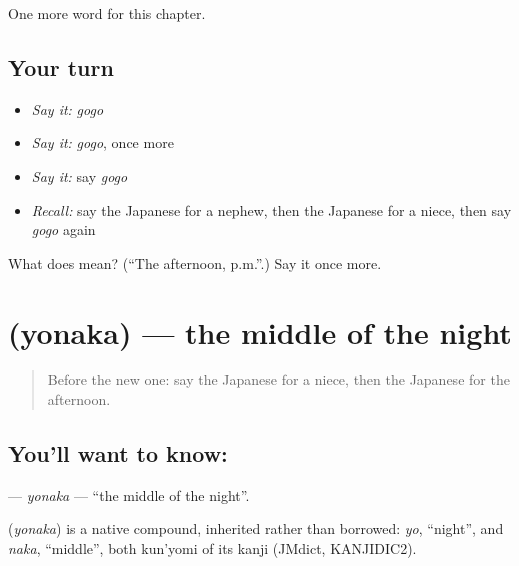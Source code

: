 \begin{grammarlens}[title={What you've built}]
One more word for this chapter.
\end{grammarlens}

\subsection*{Your turn}
\begin{itemize}
\raggedright
  \item \emph{Say it:} \emph{gogo}
  \item \emph{Say it:} \emph{gogo}, once more
  \item \emph{Say it:} say \emph{gogo}
  \item \emph{Recall:} say the Japanese for a nephew, then the Japanese for a niece, then say \emph{gogo} again
\end{itemize}

\begin{tcolorbox}[breakable,colback=teal!4,colframe=teal!35!black,title={Before you move on}]
What does  mean? (\textquotedblleft{}The afternoon, p.m.\textquotedblright{}.) Say it once more.
\end{tcolorbox}
\section[\texorpdfstring{\ja{よなか} (yonaka)}{よなか (yonaka)}]{ (yonaka) — the middle of the night}

\label{lesson:JA-C72-yonaka}



\begin{quote}
Before the new one: say the Japanese for a niece, then the Japanese for the afternoon.
\end{quote}

\subsection*{You'll want to know: }
\textbf{} — \emph{yonaka} — \textquotedblleft{}the middle of the night\textquotedblright{}.

\begin{cousinweb}
\textbf{} (\emph{yonaka}) is a native compound, inherited rather than borrowed: \emph{yo}, \textquotedblleft{}night\textquotedblright{}, and \emph{naka}, \textquotedblleft{}middle\textquotedblright{}, both kun'yomi of its kanji (JMdict, KANJIDIC2).
\end{cousinweb}

